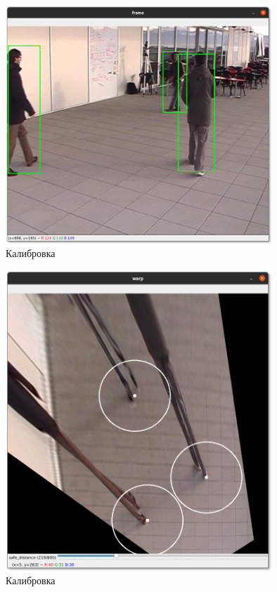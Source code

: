 \begin{figure}[H]
    \centering
    \includegraphics[width=10cm]{images/safe1.png}
    \caption{Калибровка}
    \label{<label>}
\end{figure}

\begin{figure}[H]
    \centering
    \includegraphics[width=10cm]{images/safe2.png}
    \caption{Калибровка}
    \label{<label>}
\end{figure}


